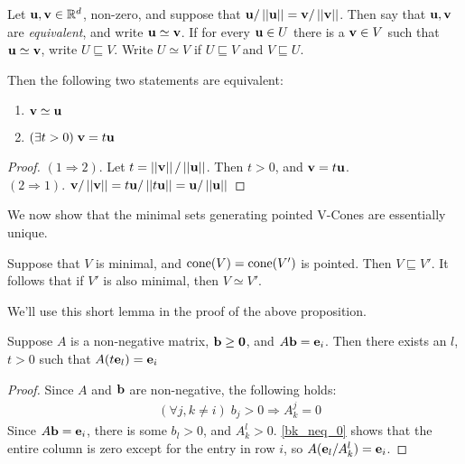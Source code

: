 \begin{Def}
	Let $\mathbf{u},\mathbf{v} \in \mathbb{R}^d$, non-zero, and suppose that $\mathbf{u}/\left|\left|\mathbf{u}\right|\right| = \mathbf{v}/\left|\left|\mathbf{v}\right|\right|$.  Then say that $\mathbf{u},\mathbf{v}$ are \textit{equivalent}, and write $\mathbf{u} \simeq \mathbf{v}$.  If for every $\mathbf{u}\in U$ there is a $\mathbf{v}\in V$ such that $\mathbf{u}\simeq\mathbf{v}$, write $ U \sqsubseteq V$.  Write $U \simeq V$ if $U \sqsubseteq V$ and $V \sqsubseteq U$.
\end{Def}

\begin{Prop}\label{vector_equivalence}
	Then the following two statements are equivalent:
	\begin{enumerate}
		\item $\mathbf{v}\simeq\mathbf{u}$
		\item $(\exists t>0)\;\mathbf{v}=t\mathbf{u}$
	\end{enumerate}
\end{Prop}

\begin{proof}
	$(1\Rightarrow 2)$.  Let $t=\left|\left|\mathbf{v}\right|\right|/\left|\left|\mathbf{u}\right|\right|$.  Then $t>0$, and $\mathbf{v}=t\mathbf{u}$.\\
	$(2\Rightarrow 1)$.  $\mathbf{v}/\left|\left|\mathbf{v}\right|\right| = t\mathbf{u}/\left|\left|t\mathbf{u}\right|\right| = \mathbf{u}/\left|\left|\mathbf{u}\right|\right|$
\end{proof}

We now show that the minimal sets generating pointed V-Cones are essentially unique.

\begin{Prop}\label{min_pointed_generators}
	Suppose that $V$ is minimal, and $\operatorname{cone}(V) = \operatorname{cone}(V')$ is pointed.  Then $V\sqsubseteq V'$.  It follows that if $V'$ is also minimal, then $V\simeq V'$.
\end{Prop}

We'll use this short lemma in the proof of the above proposition.

\begin{Lemma}\label{non_negative_sums_to_e}
	Suppose $A$ is a non-negative matrix, $\mathbf{b}\geq\mathbf{0}$, and $A\mathbf{b} = \mathbf{e}_i$.  Then there exists an $l$, $t>0$ such that $A(t\mathbf{e}_l) = \mathbf{e}_i$
\end{Lemma}

\begin{proof}
	Since $A$ and $\mathbf{b}$ are non-negative, the following holds:
	\begin{align}
		 & (\forall j,k\neq i)\; b_j   > 0 \Rightarrow A_k^j = 0 \label{bk_neq_0}
	\end{align}
	Since $A\mathbf{b}=\mathbf{e}_i$, there is some $b_l > 0$, and $A_k^l > 0$.  \eqref{bk_neq_0} shows that the entire column is zero except for the entry in row $i$, so $A(\mathbf{e}_l/A_k^l) = \mathbf{e}_i$.
\end{proof}

